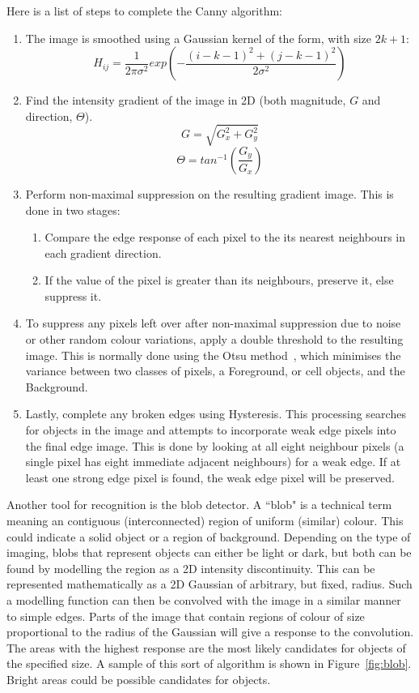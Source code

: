 Here is a list of steps to complete the Canny algorithm:
\begin{enumerate}
	\item The image is smoothed using a Gaussian kernel of the form, with size $2k + 1$:
	$$ H_{ij} = \frac{1}{2 \pi \sigma^2} exp \left( -\frac{(i - k - 1)^2 + (j - k - 1)^2}{2 \sigma^2} \right) $$
	\item Find the intensity gradient of the image in 2D (both magnitude, $G$ and direction, $\Theta$).
	$$ G = \sqrt{G^2_x + G^2_y} $$
	$$ \Theta = tan^{-1} (\frac{G_y}{G_x}) $$
	\item Perform non-maximal suppression on the resulting gradient image. This is done in two stages:
	\begin{enumerate}
		\item Compare the edge response of each pixel to the its nearest neighbours in each gradient direction.
		\item If the value of the pixel is greater than its neighbours, preserve it, else suppress it.
	\end{enumerate}
	\item To suppress any pixels left over after non-maximal suppression due to noise or other random colour variations, apply a double threshold to the resulting image. This is normally done using the Otsu method~\cite{Liao:01}, which minimises the variance between two classes of pixels, a Foreground, or cell objects, and the Background.
	\item Lastly, complete any broken edges using Hysteresis. This processing searches for objects in the image and attempts to incorporate weak edge pixels into the final edge image. This is done by looking at all eight neighbour pixels (a single pixel has eight immediate adjacent neighbours) for a weak edge. If at least one strong edge pixel is found, the weak edge pixel will be preserved.
\end{enumerate}

Another tool for recognition is the blob detector. A ``blob" is a technical term meaning an contiguous (interconnected) region of uniform (similar) colour. This could indicate a solid object or a region of background. Depending on the type of imaging, blobs that represent objects can either be light or dark, but both can be found by modelling the region as a 2D intensity discontinuity. This can be represented mathematically as a 2D Gaussian of arbitrary, but fixed, radius. Such a modelling function can then be convolved with the image in a similar manner to simple edges. Parts of the image that contain regions of colour of size proportional to the radius of the Gaussian will give a response to the convolution. The areas with the highest response are the most likely candidates for objects of the specified size. A sample of this sort of algorithm is shown in Figure~\ref{fig:blob}. Bright areas could be possible candidates for objects.

